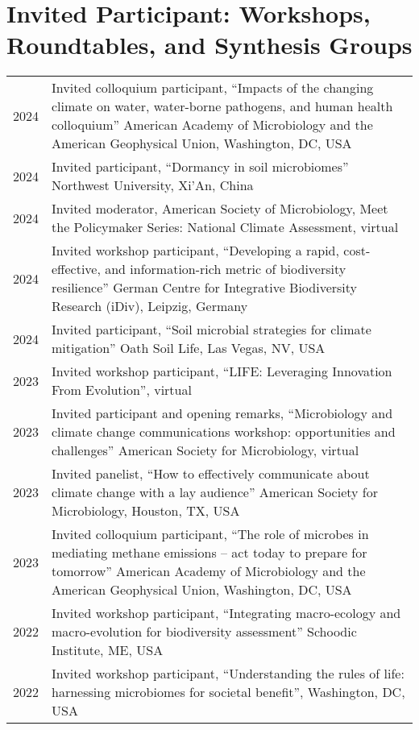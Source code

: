 \documentclass[11pt]{article}
\begin{document}
\section*{Invited Participant: Workshops, Roundtables, and Synthesis Groups}
\vspace{-1.25em} %
\noindent
\begin{longtable}{@{}p{2cm}@{\hspace{1em}}p{14cm}@{}}
2024 & Invited colloquium participant, “Impacts of the changing climate on water, water-borne pathogens, and human health colloquium” American Academy of Microbiology and the American Geophysical Union, Washington, DC, USA \\
2024 & Invited participant, “Dormancy in soil microbiomes” Northwest University, Xi’An, China \\
2024 & Invited moderator, American Society of Microbiology, Meet the Policymaker Series: National Climate Assessment, virtual \\
2024 & Invited workshop participant, “Developing a rapid, cost-effective, and information-rich metric of biodiversity resilience” German Centre for Integrative Biodiversity Research (iDiv), Leipzig, Germany \\
2024 & Invited participant, “Soil microbial strategies for climate mitigation” Oath Soil Life, Las Vegas, NV, USA \\
2023 & Invited workshop participant, “LIFE: Leveraging Innovation From Evolution”, virtual \\
2023 & Invited participant and opening remarks, “Microbiology and climate change communications workshop: opportunities and challenges” American Society for Microbiology, virtual \\
2023 & Invited panelist, “How to effectively communicate about climate change with a lay audience” American Society for Microbiology, Houston, TX, USA \\
2023 & Invited colloquium participant, “The role of microbes in mediating methane emissions – act today to prepare for tomorrow” American Academy of Microbiology and the American Geophysical Union, Washington, DC, USA \\
2022 & Invited workshop participant, “Integrating macro-ecology and macro-evolution for biodiversity assessment” Schoodic Institute, ME, USA \\
2022 & Invited workshop participant, “Understanding the rules of life: harnessing microbiomes for societal benefit”, Washington, DC, USA \\

\end{longtable}
\end{document}
